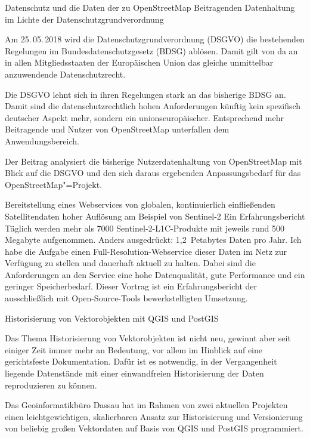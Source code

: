
%
{Datenschutz und die Daten der zu OpenStreetMap Beitragenden}%
{Datenhaltung im Lichte der \mbox{Datenschutzgrundverordnung}}%
{%
  Am 25.\,05.\,2018 wird die Datenschutzgrundverordnung (DSGVO) die bestehenden 
Regelungen im Bundesdatenschutzgesetz (BDSG) ablösen. Damit gilt von da an in allen Mitgliedsstaaten der Europäischen Union das gleiche
unmittelbar anzuwendende Datenschutzrecht.

Die DSGVO lehnt sich in ihren
Regelungen stark an das bisherige BDSG an. Damit sind die
datenschutzrechtlich hohen Anforderungen künftig kein spezifisch deutscher
Aspekt mehr, sondern ein unionseuropäischer. Entsprechend mehr Beitragende
und Nutzer von OpenStreetMap unterfallen dem
Anwendungsbereich.

Der Beitrag analysiert die bisherige Nutzerdatenhaltung von
OpenStreetMap mit Blick auf die DSGVO und den sich daraus ergebenden
Anpassungsbedarf für das OpenStreetMap"=Projekt.
}

%
{Bereitstellung eines Webservices von globalen, kontinuierlich einfließenden Satellitendaten hoher Auflösung am Beispiel von Sentinel-2}%
{Ein Erfahrungsbericht}%
{%
Täglich werden mehr als 7000 Sentinel-2-L1C-Produkte mit jeweils rund 500
Megabyte aufgenommen. Anders ausgedrückt: 1,2~Petabytes Daten pro Jahr. Ich
habe die Aufgabe einen Full-Resolution-Webservice dieser Daten im Netz zur
Verfügung zu stellen und dauerhaft aktuell zu halten. Dabei sind die
Anforderungen an den Service eine hohe Datenqualität, gute Performance und ein
geringer Speicherbedarf. Dieser Vortrag ist ein Erfahrungsbericht der
ausschließlich mit Open-Source-Tools bewerkstelligten Umsetzung.%
}



%
{Historisierung von Vektorobjekten mit QGIS und PostGIS}%
{}%
{%
Das Thema Historisierung von Vektorobjekten ist nicht neu, gewinnt aber seit
einiger Zeit immer mehr an Bedeutung, vor allem im Hinblick auf eine
gerichtsfeste Dokumentation. Dafür ist es notwendig, in der Vergangenheit
liegende Datenstände mit einer einwandfreien Historisierung der Daten
reproduzieren zu können.

Das Geoinformatikbüro Dassau hat im Rahmen von zwei aktuellen Projekten einen
leichtgewichtigen, skalierbaren Ansatz zur Historisierung und Versionierung von
beliebig großen Vektordaten auf Basis von QGIS und PostGIS programmiert.%
}

